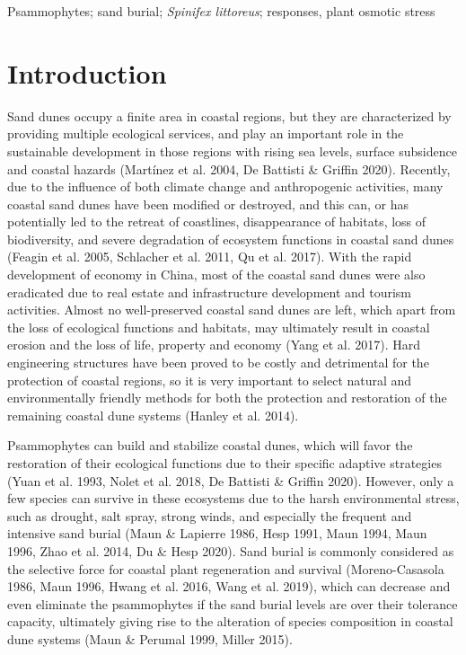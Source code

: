 \documentclass[]{interact}
\theoremstyle{plain}%
\theoremstyle{definition}
\theoremstyle{remark}
\begin{document}
\begin{keywords}
Psammophytes; sand burial; \textit{Spinifex littoreus}; responses, plant osmotic stress
\end{keywords}


\section{Introduction}

\label{Introduction-1}
Sand dunes occupy a finite area in coastal regions, but they are characterized by providing multiple ecological services, and play an important role in the sustainable development in those regions with rising sea levels, surface subsidence and coastal hazards (Martínez et al. 2004, De Battisti \& Griffin 2020). Recently, due to the influence of both climate change and anthropogenic activities, many coastal sand dunes have been modified or destroyed, and this can, or has potentially led to the retreat of coastlines, disappearance of habitats, loss of biodiversity, and severe degradation of ecosystem functions in coastal sand dunes (Feagin et al. 2005, Schlacher et al. 2011, Qu et al. 2017). With the rapid development of economy in China, most of the coastal sand dunes were also eradicated due to real estate and infrastructure development and tourism activities. Almost no well-preserved coastal sand dunes are left, which apart from the loss of ecological functions and habitats, may ultimately result in coastal erosion and the loss of life, property and economy (Yang et al. 2017). Hard engineering structures have been proved to be costly and detrimental for the protection of coastal regions, so it is very important to select natural and environmentally friendly methods for both the protection and restoration of the remaining coastal dune systems (Hanley et al. 2014).

\label{Introduction-2}
Psammophytes can build and stabilize coastal dunes, which will favor the restoration of their ecological functions due to their specific adaptive strategies (Yuan et al. 1993, Nolet et al. 2018, De Battisti \& Griffin 2020). However, only a few species can survive in these ecosystems due to the harsh environmental stress, such as drought, salt spray, strong winds, and especially the frequent and intensive sand burial (Maun \& Lapierre 1986, Hesp 1991, Maun 1994, Maun 1996, Zhao et al. 2014, Du \& Hesp 2020). Sand burial is commonly considered as the selective force for coastal plant regeneration and survival (Moreno-Casasola 1986, Maun 1996, Hwang et al. 2016, Wang et al. 2019), which can decrease and even eliminate the psammophytes if the sand burial levels are over their tolerance capacity, ultimately giving rise to the alteration of species composition in coastal dune systems (Maun \& Perumal 1999, Miller 2015). 
\end{document}
